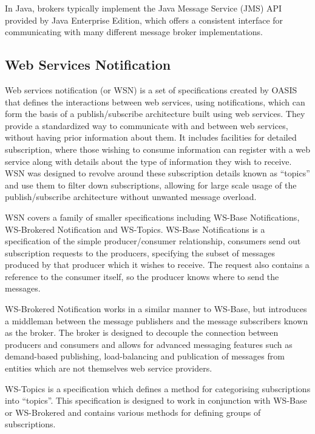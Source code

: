 \documentclass[a4paper, 12pt, twoside]{article}
\begin{document}
In Java, brokers typically implement the Java Message Service (JMS) API provided by Java Enterprise Edition, which offers a consistent interface for communicating with many different message broker implementations.

\subsection{Web Services Notification}
\label{sec:bg_wsn}

Web services notification (or WSN) is a set of specifications created by OASIS that defines the interactions between web services, using notifications, which can form the basis of a publish/subscribe architecture built using web services. They provide a standardized way to communicate with and between web services, without having prior information about them. It includes facilities for detailed subscription, where those wishing to consume information can register with a web service along with details about the type of information they wish to receive. WSN was designed to revolve around these subscription details known as ``topics'' and use them to filter down subscriptions, allowing for large scale usage of the publish/subscribe architecture without unwanted message overload.

WSN covers a family of smaller specifications including WS-Base Notifications, WS-Brokered Notification and WS-Topics. WS-Base Notifications is a specification of the simple producer/consumer relationship, consumers send out subscription requests to the producers, specifying the subset of messages produced by that producer which it wishes to receive. The request also contains a reference to the consumer itself, so the producer knows where to send the messages.

WS-Brokered Notification works in a similar manner to WS-Base, but introduces a middleman between the message publishers and the message subscribers known as the broker. The broker is designed to decouple the connection between producers and consumers and allows for advanced messaging features such as demand-based publishing, load-balancing and publication of messages from entities which are not themselves web service providers.

WS-Topics is a specification which defines a method for categorising subscriptions into ``topics''. This specification is designed to work in conjunction with WS-Base or WS-Brokered and contains various methods for defining groups of subscriptions.
\end{document}
